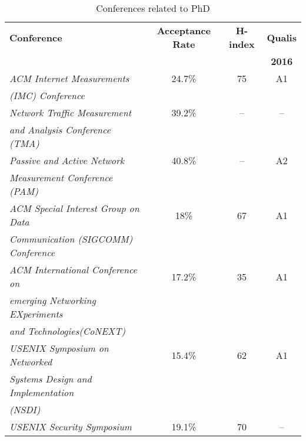 	\begin{table}[htp]
	\centering
	\begin{tabularx}{\textwidth}{ l | c | c | c }
	\hline
	{\bf Conference} & {\bf Acceptance Rate} & \textbf{H-index} & \textbf{Qualis}      \\ 
	                          							  &  &  & \textbf{2016}        \\ \hline
	\textit{ACM Internet Measurements}                    &  24.7\% & 75 & A1          \\ 
	\textit{(IMC) Conference}   						  &         &    &             \\ \hline
	\textit{Network Traffic Measurement}                  &  39.2\% & -- & --          \\
	\textit{ and Analysis Conference (TMA)}               &         &    &             \\ \hline
	\textit{Passive and Active Network}                   &  40.8\% & -- & A2          \\
	\textit{ Measurement Conference (PAM)}                &         &    &             \\ \hline
	\textit{ACM Special Interest Group on Data}           &  18\%   & 67 & A1          \\
	\textit{Communication (SIGCOMM) Conference}           &         &    &             \\ \hline
	\textit{ACM International Conference on}              &  17.2\% & 35 & A1          \\
	\textit{emerging Networking EXperiments}	          &         &    &             \\
	\textit{and Technologies(CoNEXT)}                     &         &    &             \\ \hline
	\textit{USENIX Symposium on Networked}                &  15.4\% & 62 & A1          \\
	\textit{Systems Design and Implementation}            &         &    &             \\
	\textit{(NSDI)}             				          &         &    &             \\ \hline
	\textit{USENIX Security Symposium}                    &  19.1\% & 70 & --          \\ \hline
	

	\hline
	\end{tabularx}
	\caption{Conferences related to PhD}
	\label{tbl:conferences}
	\end{table}
